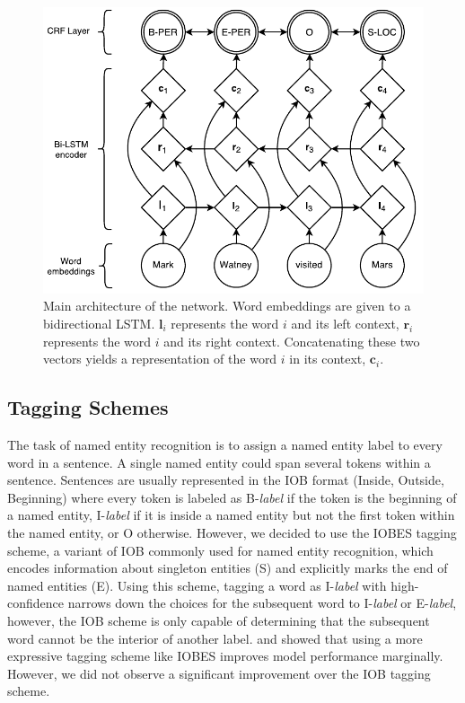 \documentclass[11pt,letterpaper]{article}
\begin{document}
\begin{figure}
  \centering
    \includegraphics[scale=0.64]{bilstm-crf4}
  \caption{Main architecture of the network. Word embeddings are given to a bidirectional LSTM. $\mathbf{l}_i$ represents the word $i$ and its left context, $\mathbf{r}_i$ represents the word $i$ and its right context. Concatenating these two vectors yields a representation of the word $i$ in its context, $\mathbf{c}_i$.}
  \label{fig:bilstm-crf}
\end{figure}



\subsection{Tagging Schemes}
\label{IOBES}
The task of named entity recognition is to assign a named entity label to every word in a sentence. A single named entity could span several tokens within a sentence. Sentences are usually represented in the IOB format (Inside, Outside, Beginning) where every token is labeled as B-\textit{label} if the token is the beginning of a named entity, I-\textit{label} if it is inside a named entity but not the first token within the named entity, or O otherwise. However, we decided to use the IOBES tagging scheme, a variant of IOB commonly used for named entity recognition, which encodes information about singleton entities (S) and explicitly marks the end of named entities (E). Using this scheme, tagging a word as I-\textit{label} with high-confidence narrows down the choices for the subsequent word to I-\textit{label} or E-\textit{label}, however, the IOB scheme is only capable of determining that the subsequent word cannot be the interior of another label.  and  showed that using a more expressive tagging scheme like IOBES improves model performance marginally. However, we did not observe a significant improvement over the IOB tagging scheme. %
\end{document}
